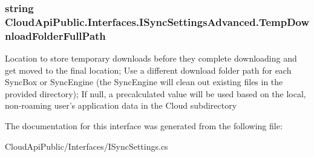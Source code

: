 \hypertarget{interface_cloud_api_public_1_1_interfaces_1_1_i_sync_settings_advanced_ad7bd9a4765d6090a05a97222c8cfd222}{
\subsubsection[{Temp\-Download\-Folder\-Full\-Path}]{\setlength{\rightskip}{0pt plus 5cm}string Cloud\-Api\-Public.\-Interfaces.\-I\-Sync\-Settings\-Advanced.\-Temp\-Download\-Folder\-Full\-Path\hspace{0.3cm}{\ttfamily [get]}}}\label{interface_cloud_api_public_1_1_interfaces_1_1_i_sync_settings_advanced_ad7bd9a4765d6090a05a97222c8cfd222}


Location to store temporary downloads before they complete downloading and get moved to the final location; Use a different download folder path for each Sync\-Box or Sync\-Engine (the Sync\-Engine will clean out existing files in the provided directory); If null, a precalculated value will be used based on the local, non-\/roaming user's application data in the Cloud subdirectory 



The documentation for this interface was generated from the following file\-:\begin{DoxyCompactItemize}
\item 
Cloud\-Api\-Public/\-Interfaces/I\-Sync\-Settings.\-cs\end{DoxyCompactItemize}
